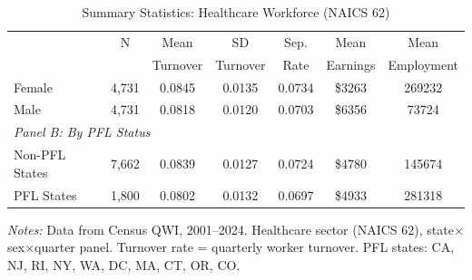 \begin{table}[htbp]
\begin{threeparttable}
\centering
\caption{Summary Statistics: Healthcare Workforce (NAICS 62)}
\label{tab:summary}
\begin{tabular}{lcccccc}
\toprule
 & N & Mean & SD & Sep. & Mean & Mean \\
 & & Turnover & Turnover & Rate & Earnings & Employment \\
\midrule
Female & 4,731 & 0.0845 & 0.0135 & 0.0734 & \$3263 & 269232 \\
Male & 4,731 & 0.0818 & 0.0120 & 0.0703 & \$6356 & 73724 \\
\midrule
\multicolumn{7}{l}{\textit{Panel B: By PFL Status}} \\
\midrule
Non-PFL States & 7,662 & 0.0839 & 0.0127 & 0.0724 & \$4780 & 145674 \\
PFL States & 1,800 & 0.0802 & 0.0132 & 0.0697 & \$4933 & 281318 \\
\bottomrule
\end{tabular}
\begin{tablenotes}
\item \textit{Notes:} Data from Census QWI, 2001--2024. Healthcare sector (NAICS 62), state$\times$sex$\times$quarter panel. Turnover rate = quarterly worker turnover. PFL states: CA, NJ, RI, NY, WA, DC, MA, CT, OR, CO.
\end{tablenotes}
\end{threeparttable}
\end{table}

